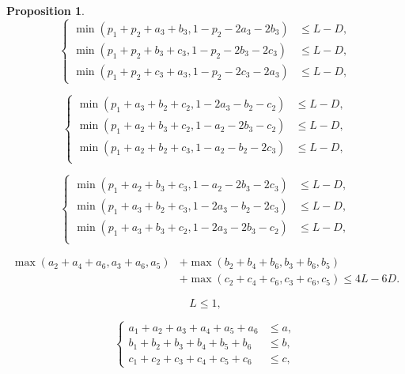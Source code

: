 \documentclass[10pt,a4paper]{amsart}
\newtheorem{prop}{Proposition}
\renewcommand{\le}{\leqslant}
\begin{document}
\begin{prop}
\medskip

\begin{equation}\label{eq:7}
\left\{
\begin{aligned}
        \min(p_1+p_2+a_3+b_3,1-p_2-2a_3-2b_3) &\le L-D,\\
        \min(p_1+p_2+b_3+c_3,1-p_2-2b_3-2c_3) &\le L-D,\\
        \min(p_1+p_2+c_3+a_3,1-p_2-2c_3-2a_3) &\le L-D,
\end{aligned}
\right.
\end{equation}

\medskip

\begin{equation}\label{eq:8}
\left\{
\begin{aligned}
        \min(p_1+a_3+b_2+c_2,1-2a_3-b_2-c_2) &\le L-D,\\
        \min(p_1+a_2+b_3+c_2,1-a_2-2b_3-c_2) &\le L-D,\\
        \min(p_1+a_2+b_2+c_3,1-a_2-b_2-2c_3) &\le L-D,\\
\end{aligned}
\right.
\end{equation}

\medskip

\begin{equation}\label{eq:9}
\left\{
\begin{aligned}
        \min(p_1+a_2+b_3+c_3,1-a_2-2b_3-2c_3) &\le L-D,\\
        \min(p_1+a_3+b_2+c_3,1-2a_3-b_2-2c_3) &\le L-D,\\
        \min(p_1+a_3+b_3+c_2,1-2a_3-2b_3-c_2) &\le L-D,\\
\end{aligned}
\right.
\end{equation}

\medskip

\begin{equation}\label{eq:10}
\begin{split}
        \max(a_2+a_4+a_6,a_3+a_6,a_5)&+\max(b_2+b_4+b_6,b_3+b_6,b_5)\\
        &+\max(c_2+c_4+c_6,c_3+c_6,c_5) 
        \le 4L-6D.
\end{split}
\end{equation}
\end{prop}

    \begin{equation}
            L \le 1,
    \end{equation}

    \begin{equation}
\left\{
\begin{aligned}
a_1+a_2+a_3+a_4+a_5+a_6 &\le a,\\
b_1+b_2+b_3+b_4+b_5+b_6 &\le b,\\
c_1+c_2+c_3+c_4+c_5+c_6 &\le c,
\end{aligned}
\right.
\end{equation}
\end{document}
